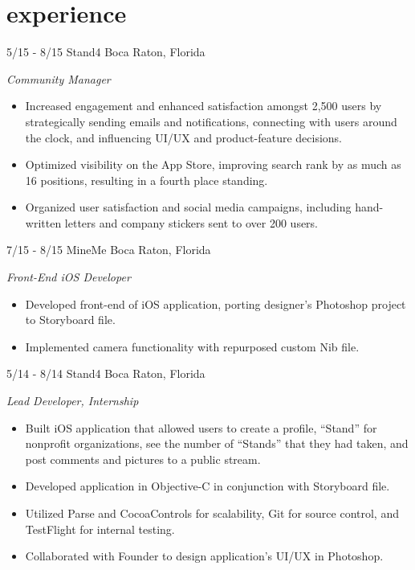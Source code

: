 \documentclass[print]{friggeri-cv}
\begin{document}
\vspace{-15pt} %

\section{experience}
\begin{entrylist}

\entry
{5/15 - 8/15}
{Stand4}
{Boca Raton, Florida}
{
\emph{Community Manager}
\begin{itemize}
	\item Increased engagement and enhanced satisfaction amongst 2,500 users by strategically sending emails and notifications, connecting with users around the clock, and influencing UI/UX and product-feature decisions. 
	\item Optimized visibility on the App Store, improving search rank by as much as 16 positions, resulting in a fourth place standing.
	\item Organized user satisfaction and social media campaigns, including hand-written letters and company stickers sent to over 200 users.   
\end{itemize} 
}

\entry
{7/15 - 8/15}
{MineMe}
{Boca Raton, Florida}
{
\emph{Front-End iOS Developer}
\begin{itemize}
	\item Developed front-end of iOS application, porting designer's Photoshop project to Storyboard file.
	\item Implemented camera functionality with repurposed custom Nib file.
\end{itemize}
}

\entry
{5/14 - 8/14}
{Stand4}
{Boca Raton, Florida}
{
\emph{Lead  Developer, Internship}
\begin{itemize}
	\item Built iOS application that allowed users to create a profile, ``Stand'' for nonprofit organizations, see the number of ``Stands'' that they had taken, and post comments and pictures to a public stream. 
	\item Developed application in Objective-C in conjunction with Storyboard file.
	\item Utilized Parse and CocoaControls for scalability, Git for source control, and TestFlight for internal testing. 
	\item Collaborated with Founder to design application's UI/UX in Photoshop.
\end{itemize}
}


\end{entrylist}
\end{document}
